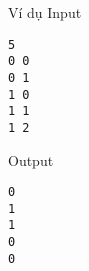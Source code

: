 Ví dụ
Input
\begin{verbatim}
5
0 0
0 1
1 0
1 1
1 2\end{verbatim}

Output
\begin{verbatim}
0
1
1
0
0\end{verbatim}